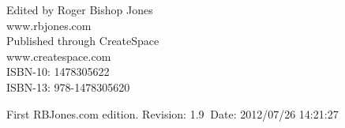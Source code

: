\begin{titlepage}
\maketitle

\hspace{2in}

\vfill

\begin{centering}




\vfill

\vspace{0.1in}
Edited by Roger Bishop Jones\\
www.rbjones.com\\
\vspace{0.2in}
Published through CreateSpace\\
www.createspace.com\\
\vspace{0.2in}
ISBN-10: 1478305622\\
ISBN-13: 978-1478305620\\
\vspace{0.2in}

{\footnotesize

First RBJones.com edition. $ $Revision: 1.9 $~$Date: 2012/07/26 14:21:27 $ $


}%

\end{centering}


\thispagestyle{empty}
\end{titlepage}

{\parskip=0pt\tableofcontents}

\vfill

